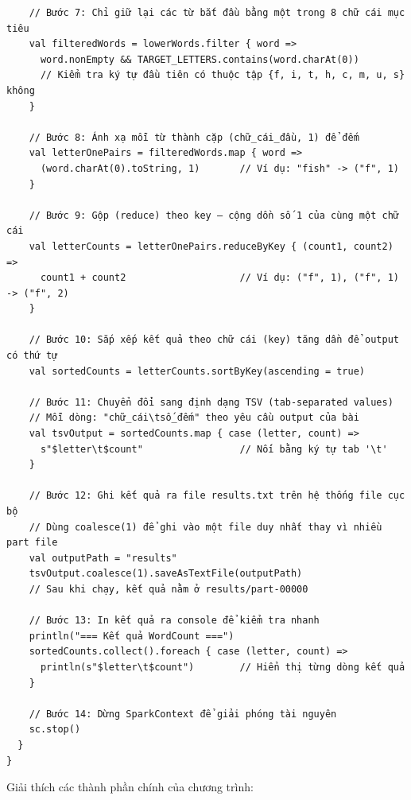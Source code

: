 \documentclass[12pt]{article}
\begin{document}
\begin{verbatim}
    // Bước 7: Chỉ giữ lại các từ bắt đầu bằng một trong 8 chữ cái mục tiêu
    val filteredWords = lowerWords.filter { word =>
      word.nonEmpty && TARGET_LETTERS.contains(word.charAt(0))
      // Kiểm tra ký tự đầu tiên có thuộc tập {f, i, t, h, c, m, u, s} không
    }

    // Bước 8: Ánh xạ mỗi từ thành cặp (chữ_cái_đầu, 1) để đếm
    val letterOnePairs = filteredWords.map { word =>
      (word.charAt(0).toString, 1)       // Ví dụ: "fish" -> ("f", 1)
    }

    // Bước 9: Gộp (reduce) theo key — cộng dồn số 1 của cùng một chữ cái
    val letterCounts = letterOnePairs.reduceByKey { (count1, count2) =>
      count1 + count2                    // Ví dụ: ("f", 1), ("f", 1) -> ("f", 2)
    }

    // Bước 10: Sắp xếp kết quả theo chữ cái (key) tăng dần để output có thứ tự
    val sortedCounts = letterCounts.sortByKey(ascending = true)

    // Bước 11: Chuyển đổi sang định dạng TSV (tab-separated values)
    // Mỗi dòng: "chữ_cái\tsố_đếm" theo yêu cầu output của bài
    val tsvOutput = sortedCounts.map { case (letter, count) =>
      s"$letter\t$count"                 // Nối bằng ký tự tab '\t'
    }

    // Bước 12: Ghi kết quả ra file results.txt trên hệ thống file cục bộ
    // Dùng coalesce(1) để ghi vào một file duy nhất thay vì nhiều part file
    val outputPath = "results"
    tsvOutput.coalesce(1).saveAsTextFile(outputPath)
    // Sau khi chạy, kết quả nằm ở results/part-00000

    // Bước 13: In kết quả ra console để kiểm tra nhanh
    println("=== Kết quả WordCount ===")
    sortedCounts.collect().foreach { case (letter, count) =>
      println(s"$letter\t$count")        // Hiển thị từng dòng kết quả
    }

    // Bước 14: Dừng SparkContext để giải phóng tài nguyên
    sc.stop()
  }
}
\end{verbatim}

Giải thích các thành phần chính của chương trình:
\end{document}
